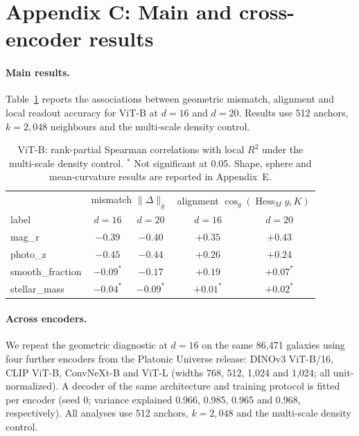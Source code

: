 \documentclass{article}
\newcommand{\norm}[1]{\lVert #1 \rVert}
\begin{document}
\section*{Appendix C: Main and cross-encoder results}

\paragraph{Main results.}
Table~\ref{tab:real} reports the associations
between geometric mismatch, alignment and local
readout accuracy for ViT-B at $d=16$ and $d=20$.
Results use 512 anchors, $k=2{,}048$ neighbours
and the multi-scale density control.

\begin{table}[h]
\centering
\footnotesize
\setlength{\tabcolsep}{3.4pt}
\begin{tabular}{lcccc}
\toprule
 & \multicolumn{2}{c}{mismatch $\norm{\Delta}_g$}
 & \multicolumn{2}{c}{alignment $\cos_g(\operatorname{Hess}_M y, K)$} \\
label & $d{=}16$ & $d{=}20$ & $d{=}16$ & $d{=}20$ \\
\midrule
mag\_r & $-0.39$ & $-0.40$ & $+0.35$ & $+0.43$ \\
photo\_z & $-0.45$ & $-0.44$ & $+0.26$ & $+0.24$ \\
smooth\_fraction & $-0.09^{*}$ & $-0.17$ & $+0.19$ & $+0.07^{*}$ \\
stellar\_mass & $-0.04^{*}$ & $-0.09^{*}$ & $+0.01^{*}$ & $+0.02^{*}$ \\
\bottomrule
\end{tabular}
\caption{ViT-B: rank-partial Spearman correlations
with local $R^2$ under the multi-scale density
control. $^{*}$ Not significant at 0.05.
Shape, sphere and mean-curvature results
are reported in Appendix~E.}
\label{tab:real}
\end{table}

\paragraph{Across encoders.}
We repeat the geometric diagnostic at $d=16$
on the same 86{,}471 galaxies using four further
encoders from the Platonic Universe release:
DINOv3 ViT-B/16, CLIP ViT-B, ConvNeXt-B and
ViT-L (widths 768, 512, 1{,}024 and 1{,}024;
all unit-normalized).
A decoder of the same architecture and training
protocol is fitted per encoder (seed 0;
variance explained 0.966, 0.985, 0.965 and
0.968, respectively). All analyses use
512 anchors, $k=2{,}048$ and the multi-scale
density control.
\end{document}
